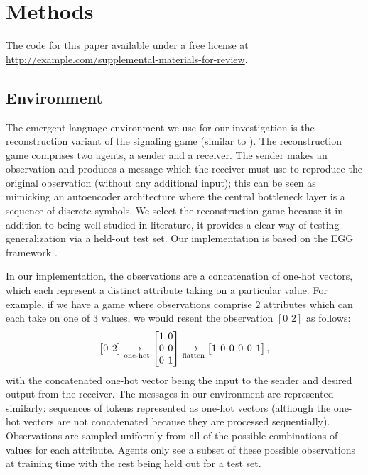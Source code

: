 \section{Methods}%
\label{sec:pb-methods}

The code for this paper available under a free license at {\small\url{http://example.com/supplemental-materials-for-review}}.

\subsection{Environment}
The emergent language environment we use for our investigation is the reconstruction variant of the signaling game (similar to \citet{chaabouni2019antiefficientencodingemergentcommunication,chaabouni-etal-2020-compositionality}).
The reconstruction game comprises two agents, a sender and a receiver.
The sender makes an observation and produces a message which the receiver must use to reproduce the original observation (without any additional input);
  this can be seen as mimicking an autoencoder architecture where the central bottleneck layer is a sequence of discrete symbols.
We select the reconstruction game because it in addition to being well-studied in literature, it provides a clear way of testing generalization via a held-out test set.
Our implementation is based on the EGG framework \citep[MIT license]{egg}.

In our implementation, the observations are a concatenation of one-hot vectors, which each represent a distinct attribute taking on a particular value.
For example, if we have a game where observations comprise $2$ attributes which can each take on one of $3$ values, we would resent the observation $[0\,\,2]$ as follows:
\[
  \setlength\arraycolsep{2pt}
  \left[\begin{matrix}0&2\end{matrix}\right]
  \underset{\text{one-hot}}\rightarrow
  \left[\begin{matrix}1&0\\0&0\\0&1\end{matrix}\right]
  \underset{\text{flatten}}\rightarrow
  \left[\begin{matrix}1&0&0&0&0&1\end{matrix}\right]
  ,
\]
with the concatenated one-hot vector being the input to the sender and desired output from the receiver.
The messages in our environment are represented similarly: sequences of tokens represented as one-hot vectors (although the one-hot vectors are not concatenated because they are processed sequentially).
Observations are sampled uniformly from all of the possible combinations of values for each attribute.
Agents only see a subset of these possible observations at training time with the rest being held out for a test set.


